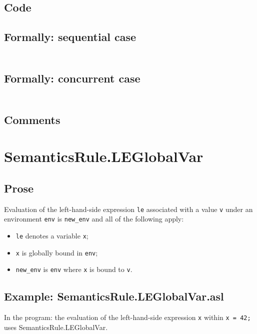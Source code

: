 \documentclass{book}
\begin{document}
  \subsection{Code}

  \subsection{Formally: sequential case}
  \begin{align}
  \end{align} 

  \subsection{Formally: concurrent case}
  \begin{align}
  \end{align} 

  \subsection{Comments}

\section{SemanticsRule.LEGlobalVar \label{sec:SemanticsRule.LEGlobalVar}}

    \subsection{Prose}
    Evaluation of the left-hand-side expression \texttt{le} associated with a
value \texttt{v} under an environment \texttt{env} is \texttt{new\_env} and all
of the following apply:
    \begin{itemize}
    \item \texttt{le} denotes a variable \texttt{x};
    \item \texttt{x} is globally bound in \texttt{env};
    \item \texttt{new\_env} is \texttt{env} where \texttt{x} is bound to \texttt{v}.
    \end{itemize}

    \subsection{Example: SemanticsRule.LEGlobalVar.asl}
    In the program:
    the evaluation of the left-hand-side expression \texttt{x} within \texttt{x = 42;} uses SemanticsRule.LEGlobalVar.
\end{document}
